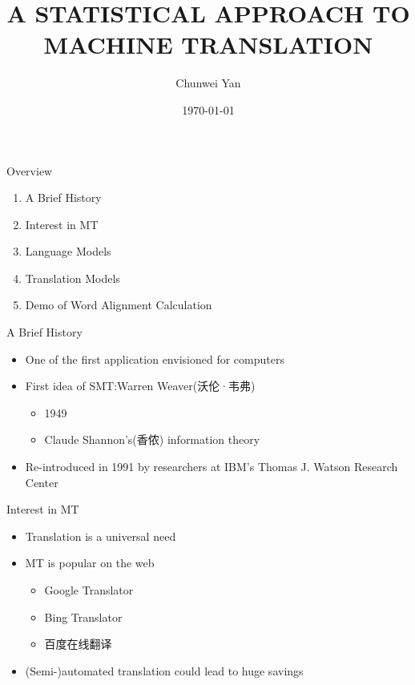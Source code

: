 \documentclass{beamer}
\title{A STATISTICAL APPROACH TO MACHINE TRANSLATION}
\author{Chunwei Yan}
\institute[PKUSZ]{
\texttt{superjom@sz.pku.edu.cn}
}
\date{\today}
\begin{document}
\begin{frame}[plain]
  \titlepage
\end{frame}

\begin{frame}{Overview}
    \begin{enumerate}
    \item A Brief History
    \item Interest in MT
    \item Language Models
    \item Translation Models
    \item Demo of Word Alignment Calculation
    \end{enumerate}
\end{frame}


\begin{frame}{A Brief History}
    \begin{itemize}
        \item One of the first application envisioned for computers
        \item First idea  of SMT:Warren Weaver(沃伦·韦弗)
            \begin{itemize}
                \item 1949
                \item Claude Shannon's(香侬) information theory
            \end{itemize}
        \item Re-introduced in 1991 by researchers at IBM's Thomas J. Watson Research Center
    \end{itemize}
\end{frame}

\begin{frame}{Interest in MT}
    \begin{itemize}
        \item Translation is a universal need
        \item MT is popular on the web
            \begin{itemize}
                \item Google Translator
                \item Bing Translator
                \item 百度在线翻译
            \end{itemize}
        \item (Semi-)automated translation could lead to huge savings
    \end{itemize}
\end{frame}
\end{document}
